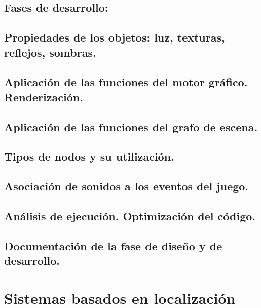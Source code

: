 \documentclass[a4paper,12pt,spanish]{sphinxmanual}
\begin{document}
\section{Fases de desarrollo:}
\label{index:fases-de-desarrollo}

\section{Propiedades de los objetos: luz, texturas, reflejos, sombras.}
\label{index:propiedades-de-los-objetos-luz-texturas-reflejos-sombras}

\section{Aplicación de las funciones del motor gráfico. Renderización.}
\label{index:aplicacion-de-las-funciones-del-motor-grafico-renderizacion}

\section{Aplicación de las funciones del grafo de escena.}
\label{index:aplicacion-de-las-funciones-del-grafo-de-escena}

\section{Tipos de nodos y su utilización.}
\label{index:tipos-de-nodos-y-su-utilizacion}

\section{Asociación de sonidos a los eventos del juego.}
\label{index:asociacion-de-sonidos-a-los-eventos-del-juego}

\section{Análisis de ejecución. Optimización del código.}
\label{index:analisis-de-ejecucion-optimizacion-del-codigo}

\section{Documentación de la fase de diseño y de desarrollo.}
\label{index:documentacion-de-la-fase-de-diseno-y-de-desarrollo}

\chapter{Sistemas basados en localización}
\label{index:sistemas-basados-en-localizacion}
\end{document}
